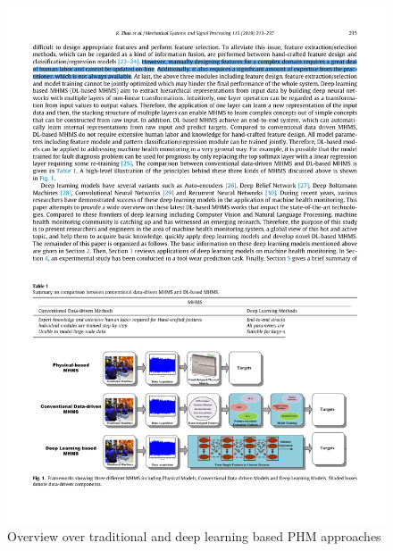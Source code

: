 \begin{figure}
  \centering
  \includegraphics[width=1\textwidth]{hand_crafted_features_physical_models_deep_learning.pdf}
  \caption {Overview over traditional and deep learning based PHM approaches \cite{ZHAO2019213}} \label{fig:hand_crafted_features_physical_models_deep_learning}
\end{figure}
